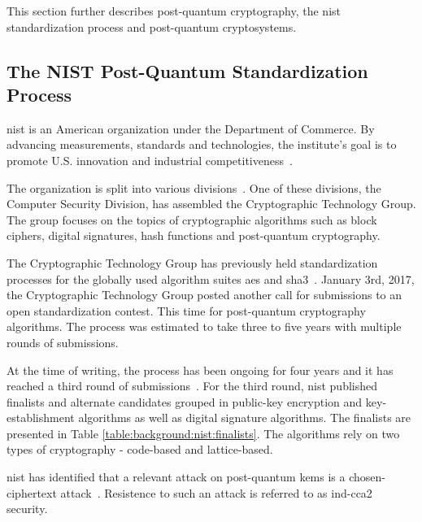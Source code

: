 This section further describes post-quantum cryptography, the \gls{nist} standardization process and post-quantum cryptosystems.

\subsection{The NIST Post-Quantum Standardization Process}
\acrfull{nist} is an American organization under the Department of Commerce. By advancing measurements, standards and technologies, the institute's goal is to promote U.S. innovation and industrial competitiveness~\cite{nist:about}.

The organization is split into various divisions~\cite{nist:ct}. One of these divisions, the Computer Security Division, has assembled the Cryptographic Technology Group. The group focuses on the topics of cryptographic algorithms such as block ciphers, digital signatures, hash functions and post-quantum cryptography.

The Cryptographic Technology Group has previously held standardization processes for the globally used algorithm suites \gls{aes} and \gls{sha3}~\cite{nist:call-for-proposals}. January 3rd, 2017, the Cryptographic Technology Group posted another call for submissions to an open standardization contest. This time for post-quantum cryptography algorithms. The process was estimated to take three to five years with multiple rounds of submissions.

At the time of writing, the process has been ongoing for four years and it has reached a third round of submissions~\cite{nist:round-three-submissions}. For the third round, \gls{nist} published finalists and alternate candidates grouped in public-key encryption and key-establishment algorithms as well as digital signature algorithms. The finalists are presented in Table \ref{table:background:nist:finalists}. The algorithms rely on two types of cryptography - code-based and lattice-based.

\gls{nist} has identified that a relevant attack on post-quantum \glspl{kem} is a chosen-ciphertext attack~\cite{nist2017}. Resistence to such an attack is referred to as \gls{ind-cca2} security.

